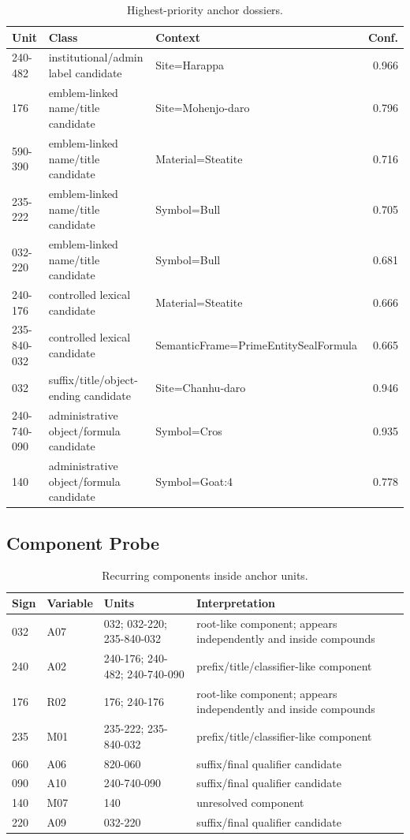 \begin{table}[htbp]
\centering
\footnotesize
\begin{tabular}{lp{}p{}r}
\toprule
\textbf{Unit} & \textbf{Class} & \textbf{Context} & \textbf{Conf.} \\
\midrule
240-482 & institutional/admin label candidate & Site=Harappa & 0.966 \\
176 & emblem-linked name/title candidate & Site=Mohenjo-daro & 0.796 \\
590-390 & emblem-linked name/title candidate & Material=Steatite & 0.716 \\
235-222 & emblem-linked name/title candidate & Symbol=Bull & 0.705 \\
032-220 & emblem-linked name/title candidate & Symbol=Bull & 0.681 \\
240-176 & controlled lexical candidate & Material=Steatite & 0.666 \\
235-840-032 & controlled lexical candidate & SemanticFrame=PrimeEntitySealFormula & 0.665 \\
032 & suffix/title/object-ending candidate & Site=Chanhu-daro & 0.946 \\
240-740-090 & administrative object/formula candidate & Symbol=Cros & 0.935 \\
140 & administrative object/formula candidate & Symbol=Goat:4 & 0.778 \\
\bottomrule
\end{tabular}
\caption{Highest-priority anchor dossiers.}
\end{table}

\subsection{Component Probe}

\begin{table}[htbp]
\centering
\footnotesize
\begin{tabular}{llp{}p{}}
\toprule
\textbf{Sign} & \textbf{Variable} & \textbf{Units} & \textbf{Interpretation} \\
\midrule
032 & A07 & 032; 032-220; 235-840-032 & root-like component; appears independently and inside compounds \\
240 & A02 & 240-176; 240-482; 240-740-090 & prefix/title/classifier-like component \\
176 & R02 & 176; 240-176 & root-like component; appears independently and inside compounds \\
235 & M01 & 235-222; 235-840-032 & prefix/title/classifier-like component \\
060 & A06 & 820-060 & suffix/final qualifier candidate \\
090 & A10 & 240-740-090 & suffix/final qualifier candidate \\
140 & M07 & 140 & unresolved component \\
220 & A09 & 032-220 & suffix/final qualifier candidate \\
\bottomrule
\end{tabular}
\caption{Recurring components inside anchor units.}
\end{table}

